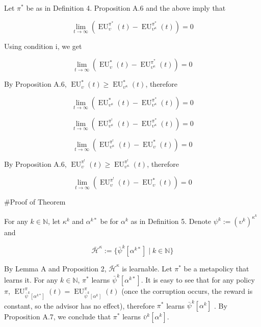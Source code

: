 \documentclass[a4paper]{article}
\newcommand{\Nats}{\mathbb{N}}
\newcommand{\Hy}{\mathcal{H}}
\newcommand{\EU}{\operatorname{EU}}
\begin{document}
Let $\pi^*$ be as in Definition 4. Proposition A.6 and the above imply that

$$\lim_{t \rightarrow \infty} (\EU_{\upsilon}^{\pi^*}(t)-\EU_{\upsilon^\kappa}^{\pi^*}(t)) = 0$$

Using condition i, we get

$$\lim_{t \rightarrow \infty} (\EU_{\upsilon}^{*}(t)-\EU_{\upsilon^\kappa}^{\pi^*}(t)) = 0$$

By Proposition A.6, $\EU_{\upsilon}^{*}(t) \geq \EU_{\upsilon^\kappa}^{*}(t)$, therefore

$$\lim_{t \rightarrow \infty} (\EU_{\upsilon^\kappa}^{*}(t)-\EU_{\upsilon^\kappa}^{\pi^*}(t)) = 0$$

$$\lim_{t \rightarrow \infty} (\EU_{\upsilon^\kappa}^{\pi^!}(t)-\EU_{\upsilon^\kappa}^{\pi^*}(t)) = 0$$

$$\lim_{t \rightarrow \infty} (\EU_{\upsilon^\kappa}^{\pi^!}(t)-\EU_{\upsilon}^{*}(t)) = 0$$

By Proposition A.6, $\EU_{\upsilon}^{\pi^!}(t) \geq \EU_{\upsilon^\kappa}^{\pi^!}(t)$, therefore

$$\lim_{t \rightarrow \infty} (\EU_{\upsilon}^{\pi^!}(t)-\EU_{\upsilon}^{*}(t)) = 0$$

\#Proof of Theorem

For any $k \in \Nats$, let $\kappa^k$ and $\alpha^{k*}$ be for $\alpha^k$ as in Definition 5. Denote $\psi^k:=(\upsilon^k)^{\kappa^k}$ and 

$$\bar{\Hy}^\kappa:=\{\bar{\psi}^k[\alpha^{k*}] \mid k \in \Nats \}$$

By Lemma A and Proposition 2, $\bar{\Hy}^\kappa$ is learnable. Let $\pi^*$ be a metapolicy that learns it. For any $k \in \Nats$, $\pi^*$ learns $\bar{\psi}^k[\alpha^{k*}]$. It is easy to see that for any policy $\pi$, $\EU_{\bar{\psi}^k[\alpha^{k*}]}^\pi(t)=\EU_{\bar{\psi}^k[\alpha^{k}]}^\pi(t)$ (once the corruption occurs, the reward is constant, so the advisor has no effect), therefore $\pi^*$ learns $\bar{\psi}^k[\alpha^{k}]$ . By Proposition A.7, we conclude that $\pi^*$ learns $\bar{\upsilon}^k[\alpha^k]$.
\end{document}
